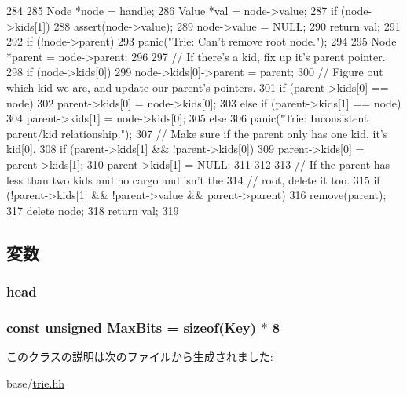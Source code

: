 \begin{DoxyCode}
284     {
285         Node *node = handle;
286         Value *val = node->value;
287         if (node->kids[1]) {
288             assert(node->value);
289             node->value = NULL;
290             return val;
291         }
292         if (!node->parent)
293             panic("Trie: Can't remove root node.\n");
294 
295         Node *parent = node->parent;
296 
297         // If there's a kid, fix up it's parent pointer.
298         if (node->kids[0])
299             node->kids[0]->parent = parent;
300         // Figure out which kid we are, and update our parent's pointers.
301         if (parent->kids[0] == node)
302             parent->kids[0] = node->kids[0];
303         else if (parent->kids[1] == node)
304             parent->kids[1] = node->kids[0];
305         else
306             panic("Trie: Inconsistent parent/kid relationship.\n");
307         // Make sure if the parent only has one kid, it's kid[0].
308         if (parent->kids[1] && !parent->kids[0]) {
309             parent->kids[0] = parent->kids[1];
310             parent->kids[1] = NULL;
311         }
312 
313         // If the parent has less than two kids and no cargo and isn't the
314         // root, delete it too.
315         if (!parent->kids[1] && !parent->value && parent->parent)
316             remove(parent);
317         delete node;
318         return val;
319     }
\end{DoxyCode}


\subsection{変数}
\hypertarget{classTrie_ab0204d8f12b6e8896928382d5274cab0}{
\subsubsection[{head}]{ {\bf head}}}
\label{classTrie_ab0204d8f12b6e8896928382d5274cab0}
\hypertarget{classTrie_a053e1542a5279ab920fa8fa174e9eda9}{
\subsubsection[{MaxBits}]{\setlength{\rightskip}{0pt plus 5cm}const unsigned {\bf MaxBits} = sizeof(Key) $\ast$ 8}}
\label{classTrie_a053e1542a5279ab920fa8fa174e9eda9}


このクラスの説明は次のファイルから生成されました:\begin{DoxyCompactItemize}
\item 
base/\hyperlink{trie_8hh}{trie.hh}\end{DoxyCompactItemize}
